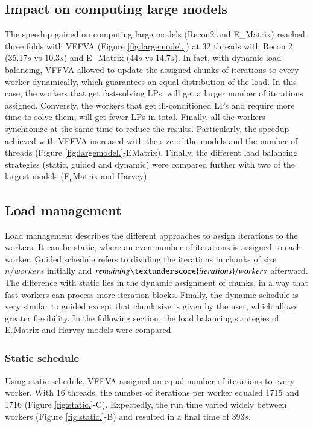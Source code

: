 \subsection*{Impact on computing large models}
The speedup gained on computing large models (Recon2 and E\_Matrix) reached three folds with VFFVA (Figure \ref{fig:largemodel.}) at 32 threads with Recon 2 (35.17$s$ vs 10.3$s$) and E\_Matrix (44$s$ vs 14.7$s$). In fact, with dynamic load balancing, VFFVA allowed to update the assigned chunks of iterations to every worker dynamically, which guarantees an equal distribution of the load. In this case, the workers that get fast-solving LPs, will get a larger number of iterations assigned. Conversly, the workers that get ill-conditioned LPs and require more time to solve them, will get fewer LPs in total. Finally, all the workers synchronize at the same time to reduce the results. Particularly, the speedup achieved with VFFVA increased with the size of the models and the number of threads (Figure \ref{fig:largemodel.}-E\textunderscore Matrix). 
Finally, the different load balancing strategies (static, guided and dynamic) were compared further with two of the largest models (E\textsubscript{c}\textunderscore Matrix and Harvey).

\subsection*{Load management}
Load management describes the different approaches to assign iterations to the workers. It can be static, where an even number of iterations is assigned to each worker. Guided schedule refers to dividing the iterations in chunks of size $n/workers$ initially and $remaining\textunderscore{iterations}/workers$ afterward. The difference with static lies in the dynamic assignment of chunks, in a way that fast workers can process more iteration blocks. Finally, the dynamic schedule is very similar to guided except that chunk size is given by the user, which allows greater flexibility. In the following section, the load balancing strategies of E\textsubscript{c}\textunderscore Matrix and Harvey models were compared.\\

\subsubsection*{Static schedule}
Using static schedule, VFFVA assigned an equal number of iterations to every worker. With 16 threads, the number of iterations per worker equaled 1715 and 1716 (Figure \ref{fig:static.}-C). Expectedly, the run time varied widely between workers (Figure \ref{fig:static.}-B) and resulted in a final time of 393$s$.
